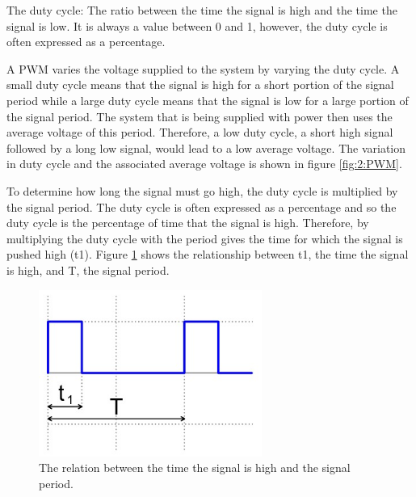 The duty cycle: The ratio between the time the signal is high and the time the signal is low. It is always a value between 0 and 1, however, the duty cycle is often expressed as a percentage.\par
\vspace{0.6cm}
A PWM varies the voltage supplied to the system by varying the duty cycle. A small duty cycle means that the signal is high for a short portion of the signal period while a large duty cycle means that the signal is low for a large portion of the signal period. The system that is being supplied with power then uses the average voltage of this period. Therefore, a low duty cycle, a short high signal followed by a long low signal, would lead to a low average voltage. The variation in duty cycle and the associated average voltage is shown in figure \ref{fig:2:PWM}. \cite{Ibrahim2014}\par
\vspace{0.6cm}
To determine how long the signal must go high, the duty cycle is multiplied by the signal period. The duty cycle is often expressed as a percentage and so the duty cycle is the percentage of time that the signal is high. Therefore, by multiplying the duty cycle with the period gives the time for which the signal is pushed high (t1). Figure \ref{fig:2:PWMPulse} shows the relationship between t1, the time the signal is high, and T, the signal period.\par
\vspace{0.6cm}
\begin{figure}
	\begin{center}
		\includegraphics[width = 0.65\textwidth]{figures/PulseWideWave.jpg}
		\caption{The relation between the time the signal is high and the signal period.}
		\label{fig:2:PWMPulse}
	\end{center}
\end{figure}
